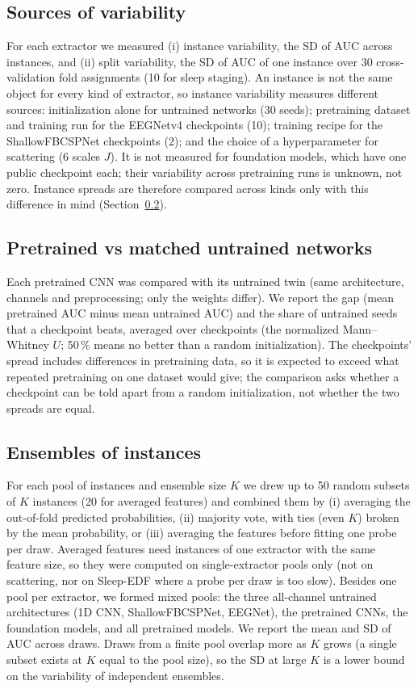 \documentclass[11pt]{article}
\begin{document}
\subsection{Sources of variability}
For each extractor we measured (i) instance variability, the SD of AUC across instances, and
(ii) split variability, the SD of AUC of one instance over 30 cross-validation fold assignments
(10 for sleep staging). An instance is not the same object for every kind of extractor, so
instance variability measures different sources: initialization alone for untrained networks
(30 seeds); pretraining dataset and training run for the EEGNetv4 checkpoints (10); training
recipe for the ShallowFBCSPNet checkpoints (2); and the choice of a hyperparameter for scattering
(6 scales $J$). It is not measured for foundation models, which have one public checkpoint each;
their variability across pretraining runs is unknown, not zero. Instance spreads are therefore
compared across kinds only with this difference in mind (Section~\ref{sec:matched}).

\subsection{Pretrained vs matched untrained networks}\label{sec:matched}
Each pretrained CNN was compared with its untrained twin (same architecture, channels and
preprocessing; only the weights differ). We report the gap (mean pretrained AUC minus mean
untrained AUC) and the share of untrained seeds that a checkpoint beats, averaged over
checkpoints (the normalized Mann--Whitney $U$; 50\,\% means no better than a random
initialization). The checkpoints' spread includes differences in pretraining data, so it is
expected to exceed what repeated pretraining on one dataset would give; the comparison asks whether
a checkpoint can be told apart from a random initialization, not whether the two spreads are
equal.

\subsection{Ensembles of instances}
For each pool of instances and ensemble size $K$ we drew up to 50 random subsets of $K$ instances
(20 for averaged features) and combined them by (i) averaging the out-of-fold predicted
probabilities, (ii) majority vote, with ties (even $K$) broken by the mean probability, or
(iii) averaging the features before fitting one probe per draw. Averaged features need instances
of one extractor with the same feature size, so they were computed on single-extractor pools
only (not on scattering, nor on Sleep-EDF where a probe per draw is too slow). Besides one pool per
extractor, we formed mixed pools: the three all-channel untrained architectures (1D CNN,
ShallowFBCSPNet, EEGNet), the pretrained CNNs, the foundation models, and all pretrained models.
We report the mean and SD of AUC across draws. Draws from a finite pool overlap more as $K$ grows
(a single subset exists at $K$ equal to the pool size), so the SD at large $K$ is a lower bound on
the variability of independent ensembles.
\end{document}
